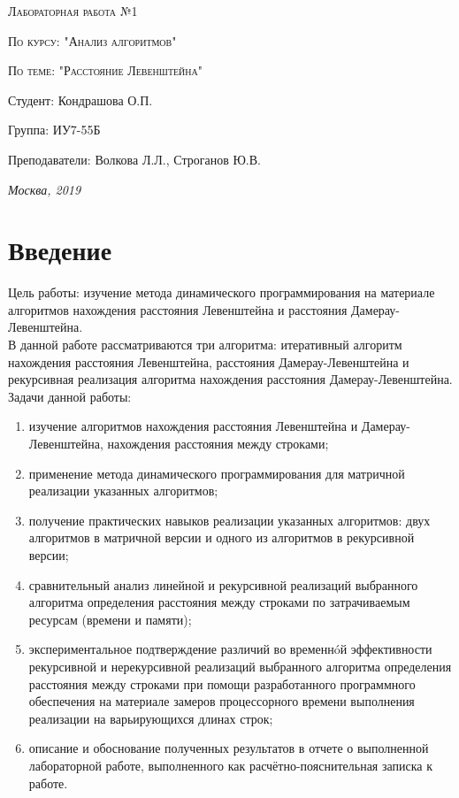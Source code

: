 \documentclass[a4paper, 14pt]{article}
\begin{document}
\begin{titlepage}
	\centering
	{\scshape\Large Лабораторная работа №1\par}
	{\scshape\Large По курсу: "Анализ алгоритмов"\par}
	{\scshape\Large По теме: "Расстояние Левенштейна"\par}
	\vspace{7cm}
	\Large Студент: Кондрашова О.П.\par
	\Large Группа: ИУ7-55Б\par
	\Large Преподаватели:  Волкова Л.Л., Строганов Ю.В.\par

	\vfill
	\large \textit {Москва, 2019} \par
	
\end{titlepage}

	\setcounter{page}{2}
	\tableofcontents
	
	\newpage
	\section*{Введение}
	
	
	Цель работы: изучение метода динамического программирования на материале алгоритмов нахождения расстояния Левенштейна и расстояния Дамерау-Левенштейна.\\
	
	
	В данной работе рассматриваются три алгоритма: итеративный алгоритм нахождения расстояния Левенштейна, расстояния Дамерау-Левенштейна и рекурсивная реализация алгоритма нахождения расстояния Дамерау-Левенштейна.\\
	
	Задачи данной работы:
\begin{enumerate}
\item изучение алгоритмов нахождения расстояния Левенштейна и Дамерау-Левенштейна, нахождения расстояния между строками;
\item применение метода динамического программирования для матричной реализации указанных алгоритмов; 
\item получение практических навыков реализации указанных алгоритмов: двух алгоритмов в матричной версии и одного из алгоритмов в рекурсивной версии; 
\item сравнительный анализ линейной и рекурсивной реализаций выбранного алгоритма определения расстояния между строками по затрачиваемым ресурсам (времени и памяти); 
\item экспериментальное подтверждение различий во временнóй эффективности рекурсивной и
нерекурсивной реализаций выбранного алгоритма определения расстояния между строками при
помощи разработанного программного обеспечения на материале замеров процессорного времени
выполнения реализации на варьирующихся длинах строк; 
\item описание и обоснование полученных результатов в отчете о выполненной лабораторной
работе, выполненного как расчётно-пояснительная записка к работе. 
\end{enumerate}
\end{document}
